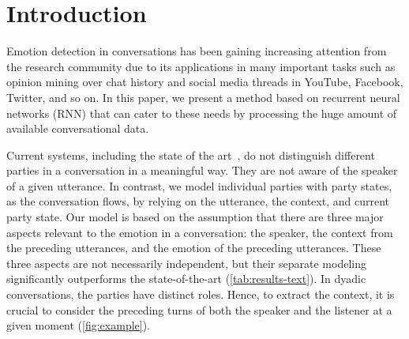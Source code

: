 \documentclass[letterpaper]{article} %
\begin{document}
\section{Introduction}
\label{sec:introduction}
Emotion detection in conversations has been gaining increasing attention from the research community due to its applications in many
important tasks such as opinion mining over chat history and social media threads in YouTube,
Facebook, Twitter, and so on. %
In this paper, we present a method based on recurrent neural networks (RNN) that can cater to these needs by
processing the huge amount of available conversational data.

Current systems, including the state of the art~\cite{hazarika-EtAl:2018:N18-1}, do not distinguish different parties in a conversation in a meaningful way.
They are not aware of
the speaker of a given utterance.
In contrast, we model individual parties with party states, as the conversation flows,
by relying on the utterance, the context, and current party state.
Our model is based on the assumption that there are three major aspects relevant to the
emotion in a conversation: the speaker, the context from the preceding utterances, and the emotion of the preceding utterances.
These three aspects are not necessarily independent, but their separate modeling significantly
outperforms the state-of-the-art (\cref{tab:results-text}).
In dyadic conversations, the parties have distinct roles. Hence, to extract the context,
it is crucial to consider the preceding turns of both the speaker and the listener at a given
moment (\cref{fig:example}).
\end{document}
